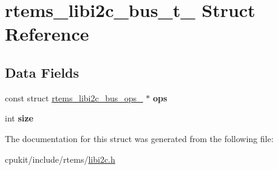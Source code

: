 \hypertarget{structrtems__libi2c__bus__t__}{}\section{rtems\+\_\+libi2c\+\_\+bus\+\_\+t\+\_\+ Struct Reference}
\label{structrtems__libi2c__bus__t__}
\subsection*{Data Fields}
\begin{DoxyCompactItemize}
\item 
\mbox{\label{structrtems__libi2c__bus__t___a4da7c7c6ff11c684808e3e3d689c33c3}} 
const struct \mbox{\hyperlink{structrtems__libi2c__bus__ops__}{rtems\+\_\+libi2c\+\_\+bus\+\_\+ops\+\_\+}} $\ast$ {\bfseries ops}
\item 
\mbox{\label{structrtems__libi2c__bus__t___a9ed28319125992d0bdc61f7c1c94a4f9}} 
int {\bfseries size}
\end{DoxyCompactItemize}


The documentation for this struct was generated from the following file\+:\begin{DoxyCompactItemize}
\item 
cpukit/include/rtems/\mbox{\hyperlink{libi2c_8h}{libi2c.\+h}}\end{DoxyCompactItemize}
